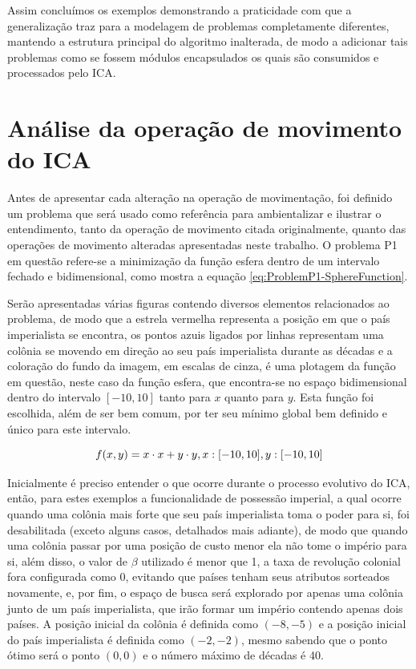 Assim concluímos os exemplos demonstrando a praticidade com que a generalização traz para a modelagem de problemas completamente diferentes, mantendo a estrutura principal do algoritmo inalterada, de modo a adicionar tais problemas como se fossem módulos encapsulados os quais são consumidos e processados pelo ICA.









\section{Análise da operação de movimento do ICA}
\label{Análise da operação de movimento do ICA}


Antes de apresentar cada alteração na operação de movimentação, foi definido um problema que será usado como referência para ambientalizar e ilustrar o entendimento, tanto da operação de movimento citada originalmente, quanto das operações de movimento alteradas apresentadas neste trabalho. O problema P1 em questão refere-se a minimização da função esfera dentro de um intervalo fechado e bidimensional, como mostra a equação \ref{eq:ProblemP1-SphereFunction}.  

Serão apresentadas várias figuras contendo diversos elementos relacionados ao problema, de modo que a estrela vermelha representa a posição em que o país imperialista se encontra, os pontos azuis ligados por linhas representam uma colônia se movendo em direção ao seu país imperialista durante as décadas e a coloração do fundo da imagem, em escalas de cinza, é uma plotagem da função em questão, neste caso da função esfera, que encontra-se no espaço bidimensional dentro do intervalo \(\left[-10, 10\right]\) tanto para \(x\) quanto para \(y\). Esta função foi escolhida, além de ser bem comum, por ter seu mínimo global bem definido e único para este intervalo.

\begin{equation}
f(x,y) = x \cdot x + y \cdot y, \\ x:[-10,10], \\y:[-10,10]
\label{eq:ProblemP1-SphereFunction}
\end{equation}

Inicialmente é preciso entender o que ocorre durante o processo evolutivo do ICA, então, para estes exemplos a funcionalidade de possessão imperial, a qual ocorre quando uma colônia mais forte que seu país imperialista toma o poder para si, foi desabilitada (exceto alguns casos, detalhados mais adiante), de modo que quando uma colônia passar por uma posição de custo menor ela não tome o império para si, além disso, o valor de \(\beta\) utilizado é menor que 1, a taxa de revolução colonial fora configurada como 0, evitando que países tenham seus atributos sorteados novamente, e, por fim, o espaço de busca será explorado por apenas uma colônia junto de um país imperialista, que irão formar um império contendo apenas dois países. A posição inicial da colônia é definida como \((-8,-5)\) e a posição inicial do país imperialista é definida como \((-2,-2)\), mesmo sabendo que o ponto ótimo será o ponto \((0,0)\) e o número máximo de décadas é 40.

